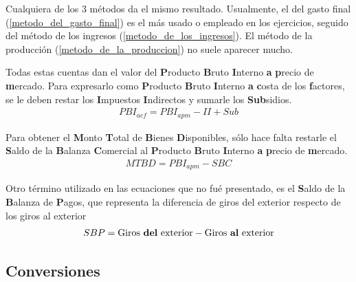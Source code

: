 \documentclass[12pt,a4paper]{article}
\begin{document}
    
    \hrulefill
    
    \par{
    	Cualquiera de los 3 métodos da el mismo resultado.
        Usualmente, el del gasto final (\ref{metodo_del_gasto_final}) es el más usado o empleado en los ejercicios, seguido del método de los ingresos (\ref{metodo_de_los_ingresos}).
        El método de la producción (\ref{metodo_de_la_produccion}) no suele aparecer mucho.
        }
        
    \par{
    	Todas estas cuentas dan el valor del \textbf{P}roducto \textbf{B}ruto \textbf{I}nterno \textbf{a} \textbf{p}recio de \textbf{m}ercado.
        Para expresarlo como \textbf{P}roducto \textbf{B}ruto \textbf{I}nterno \textbf{a} \textbf{c}osta de los \textbf{f}actores, se le deben restar los \textbf{I}mpuestos \textbf{I}ndirectos y sumarle los \textbf{Sub}sidios.
        \begin{align}
            {PBI}_{acf} = {PBI}_{apm} - II + Sub
        \end{align}
        }
        
    \par{
    	Para obtener el \textbf{M}onto \textbf{T}otal de \textbf{B}ienes \textbf{D}isponibles, sólo hace falta restarle el \textbf{S}aldo de la \textbf{B}alanza \textbf{C}omercial al \textbf{P}roducto \textbf{B}ruto \textbf{I}nterno \textbf{a} \textbf{p}recio de \textbf{m}ercado.
        \begin{align}
            {MTBD} = {PBI}_{apm} - SBC
            \label{monto_total_bienes_disponibles}
        \end{align}
    	}
        
    \par{
    	Otro término utilizado en las ecuaciones que no fué presentado, es el \textbf{S}aldo de la \textbf{B}alanza de \textbf{P}agos, que representa la diferencia de giros del exterior respecto de los giros al exterior
        \begin{align}
            SBP = \text{Giros \textbf{del} exterior} - \text{Giros \textbf{al} exterior}
        \end{align}
    	}
        
    \hrulefill
        
    
    \subsection{Conversiones}
    
\end{document}

